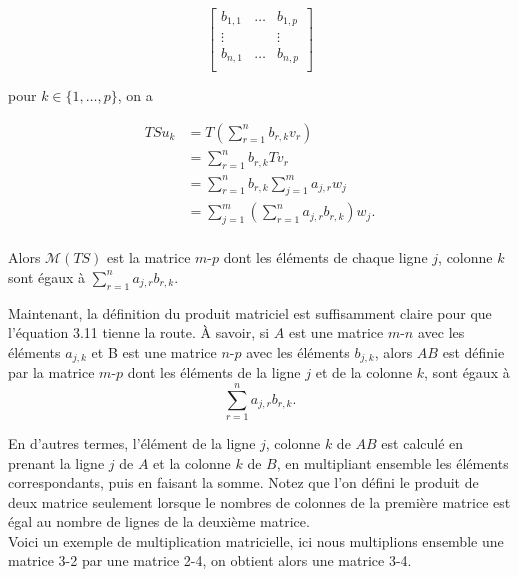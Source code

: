 \documentclass[12pt]{book}
\begin{document}
\begin{equation*}\begin{bmatrix}
    b_{1,1} & \ldots & b_{1,p} \\
    \vdots & & \vdots\\
    b_{n,1} & \ldots & b_{n,p} \\
\end{bmatrix}\end{equation*}

pour $k\in\{1,\ldots,p\}$, on a 

\begin{equation*}
    \begin{split}
        TSu_k &=T(\sum_{r=1}^nb_{r,k}v_r)\\
        & = \sum_{r=1}^nb_{r,k}Tv_r\\
        & = \sum_{r=1}^nb_{r,k}\sum_{j=1}^ma_{j,r}w_j\\
        & = \sum_{j=1}^m(\sum_{r=1}^na_{j,r}b_{r,k})w_j.\\
    \end{split}
\end{equation*}

Alors $\mathcal{M}(TS)$ est la matrice $m$-$p$ dont les éléments de chaque ligne $j$, colonne $k$ sont égaux à $\sum_{r=1}^na_{j,r}b_{r,k}$.

Maintenant, la définition du produit matriciel est suffisamment claire pour que l'équation 3.11 tienne la route. À savoir, si $A$ est une matrice $m$-$n$ avec les éléments $a_{j,k}$ et B est une matrice $n$-$p$ avec les éléments $b_{j,k}$, alors $AB$ est définie par la matrice $m$-$p$ dont les éléments de la ligne $j$ et de la colonne $k$, sont égaux à
\begin{equation*}
   \sum_{r=1}^na_{j,r}b_{r,k}.
\end{equation*}

En d'autres termes, l'élément de la ligne $j$, colonne $k$ de $AB$ est calculé en prenant la ligne $j$ de $A$ et la colonne $k$ de $B$, en multipliant ensemble les éléments correspondants, puis en faisant la somme. Notez que l'on défini le produit de deux matrice seulement lorsque le nombres de colonnes de la première matrice est égal au nombre de lignes de la deuxième matrice. \\

Voici un exemple de multiplication matricielle, ici nous multiplions ensemble une matrice 3-2 par une matrice 2-4, on obtient alors une matrice 3-4.
\end{document}
